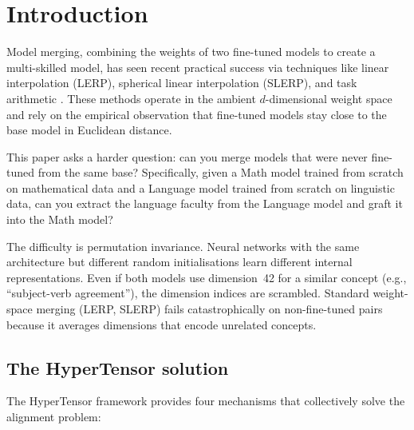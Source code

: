 \documentclass[11pt]{article}
\begin{document}
\section{Introduction}
\label{sec:intro}

Model merging, combining the weights of two fine-tuned models to
create a multi-skilled model, has seen recent practical success via
techniques like linear interpolation (LERP), spherical linear
interpolation (SLERP), and task arithmetic
\cite{ilharco2022editing, wortsman2022task}. These methods operate in
the ambient $d$-dimensional weight space and rely on the empirical
observation that fine-tuned models stay close to the base model in
Euclidean distance.

This paper asks a harder question: can you merge models that were
never fine-tuned from the same base? Specifically, given a Math
model trained from scratch on mathematical data and a Language model
trained from scratch on linguistic data, can you extract the language
faculty from the Language model and graft it into the Math model?

The difficulty is permutation invariance. Neural networks with the same
architecture but different random initialisations learn different
internal representations. Even if both models use dimension~42 for a
similar concept (e.g., ``subject-verb agreement''), the dimension
indices are scrambled. Standard weight-space merging (LERP, SLERP)
fails catastrophically on non-fine-tuned pairs because it averages
dimensions that encode unrelated concepts.

\subsection{The HyperTensor solution}

The HyperTensor framework provides four mechanisms that collectively
solve the alignment problem:
\end{document}
